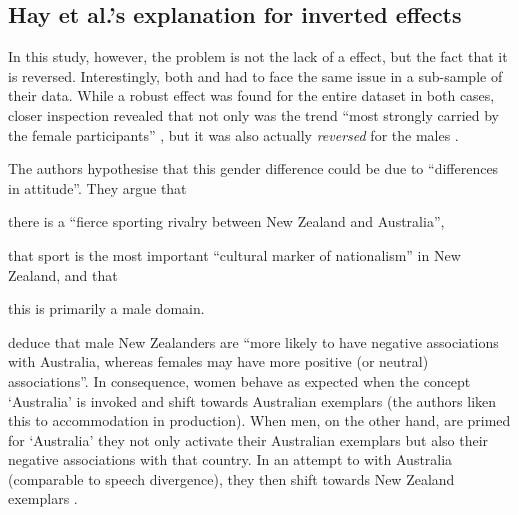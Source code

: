 		\subsection{Hay et al.'s explanation for inverted effects}

In this study, however, the problem is not the lack of a  effect, but the fact that it is reversed.
Interestingly, both \textcite{hayetal2006a} and \textcite{haydrager2010} had to face the same issue in a sub-sample of their data.
While a robust  effect was found for the entire dataset in both cases, closer inspection revealed that not only was the trend ``most strongly carried by the female participants'' \parencite[875]{haydrager2010}, but it was also actually \emph{reversed} for the males \parencite[cf.][876--877]{haydrager2010}.

The authors hypothesise that this gender difference could be due to ``differences in attitude''.
They argue that
	\begin{inparaenum}[(a)]
		\item there is a ``fierce sporting rivalry between New Zealand and Australia'',
		\item that sport is the most important ``cultural marker of nationalism'' in New Zealand, and that
		\item this is primarily a male domain.
	\end{inparaenum}
\citeauthor{haydrager2010} deduce that male New Zealanders are ``more likely to have negative associations with Australia, whereas females may have more positive (or neutral) associations''.
In consequence, women behave as expected when the concept `Australia' is invoked and shift towards Australian exemplars (the authors liken this to accommodation in production).
When men, on the other hand, are primed for `Australia' they not only activate their Australian exemplars but also their negative associations with that country.
In an attempt to  with Australia (comparable to speech divergence), they then shift towards New Zealand exemplars \parencite[cf.][884--885]{haydrager2010}.

